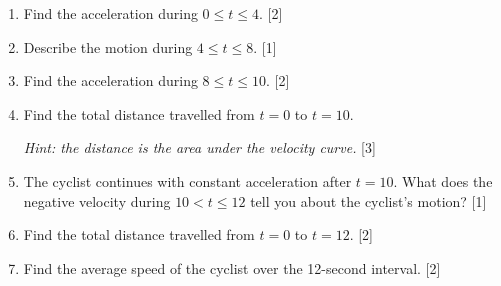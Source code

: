 \documentclass[12pt, twoside]{article}
\begin{document}
\begin{enumerate}[itemsep=0.4cm]
\begin{enumerate}[itemsep=0.5cm]
  \item Find the acceleration during $0 \leq t \leq 4$. \hfill [2]
  \item Describe the motion during $4 \leq t \leq 8$. \hfill [1]
  \item Find the acceleration during $8 \leq t \leq 10$. \hfill [2]
  \item Find the total distance travelled from $t = 0$ to $t = 10$.

  \emph{Hint: the distance is the area under the velocity curve.} \hfill [3]
  \vspace{1.5cm}
  \item The cyclist continues with constant acceleration after $t = 10$.
        What does the negative velocity during $10 < t \leq 12$ tell you
        about the cyclist's motion? \hfill [1]
  \item Find the total distance travelled from $t = 0$ to $t = 12$. \hfill [2]
  \item Find the average speed of the cyclist over the 12-second interval. \hfill [2]
\end{enumerate}

\end{enumerate}
\end{document}

